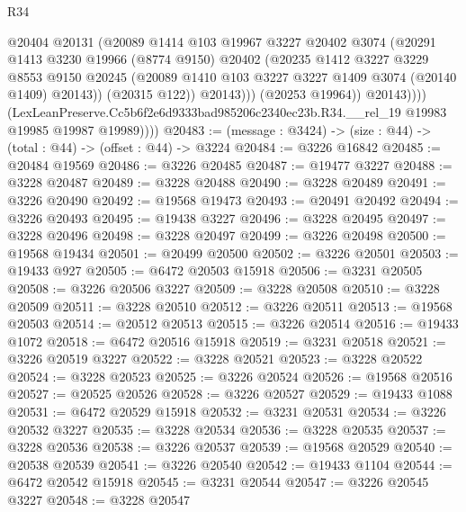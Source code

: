 \begin{lexlean}{R34}
\begin{coremodule}
                        @20404
                        @20131
                        (@20089
                          @1414
                          @103
                          @19967
                          @3227
                          @20402
                          @3074
                          (@20291
                            @1413
                            @3230
                            @19966
                            (@8774 @9150)
                            @20402
                            (@20235
                              @1412
                              @3227
                              @3229
                              @8553
                              @9150
                              @20245
                              (@20089 @1410 @103 @3227 @3227 @1409 @3074 (@20140 @1409) @20143))
                            (@20315 @122))
                          @20143)))
                    (@20253 @19964))
                  @20143))))
          (LexLeanPreserve.Cc5b6f2e6d9333bad985206c2340ec23b.R34.__rel_19
            @19983
            @19985
            @19987
            @19989))))
@20483 := (message : @3424) -> (size : @44) -> (total : @44) -> (offset : @44) -> @3224
@20484 := @3226 @16842
@20485 := @20484 @19569
@20486 := @3226 @20485
@20487 := @19477 @3227
@20488 := @3228 @20487
@20489 := @3228 @20488
@20490 := @3228 @20489
@20491 := @3226 @20490
@20492 := @19568 @19473
@20493 := @20491 @20492
@20494 := @3226 @20493
@20495 := @19438 @3227
@20496 := @3228 @20495
@20497 := @3228 @20496
@20498 := @3228 @20497
@20499 := @3226 @20498
@20500 := @19568 @19434
@20501 := @20499 @20500
@20502 := @3226 @20501
@20503 := @19433 @927
@20505 := @6472 @20503 @15918
@20506 := @3231 @20505
@20508 := @3226 @20506 @3227
@20509 := @3228 @20508
@20510 := @3228 @20509
@20511 := @3228 @20510
@20512 := @3226 @20511
@20513 := @19568 @20503
@20514 := @20512 @20513
@20515 := @3226 @20514
@20516 := @19433 @1072
@20518 := @6472 @20516 @15918
@20519 := @3231 @20518
@20521 := @3226 @20519 @3227
@20522 := @3228 @20521
@20523 := @3228 @20522
@20524 := @3228 @20523
@20525 := @3226 @20524
@20526 := @19568 @20516
@20527 := @20525 @20526
@20528 := @3226 @20527
@20529 := @19433 @1088
@20531 := @6472 @20529 @15918
@20532 := @3231 @20531
@20534 := @3226 @20532 @3227
@20535 := @3228 @20534
@20536 := @3228 @20535
@20537 := @3228 @20536
@20538 := @3226 @20537
@20539 := @19568 @20529
@20540 := @20538 @20539
@20541 := @3226 @20540
@20542 := @19433 @1104
@20544 := @6472 @20542 @15918
@20545 := @3231 @20544
@20547 := @3226 @20545 @3227
@20548 := @3228 @20547

\end{coremodule}
\end{lexlean}
